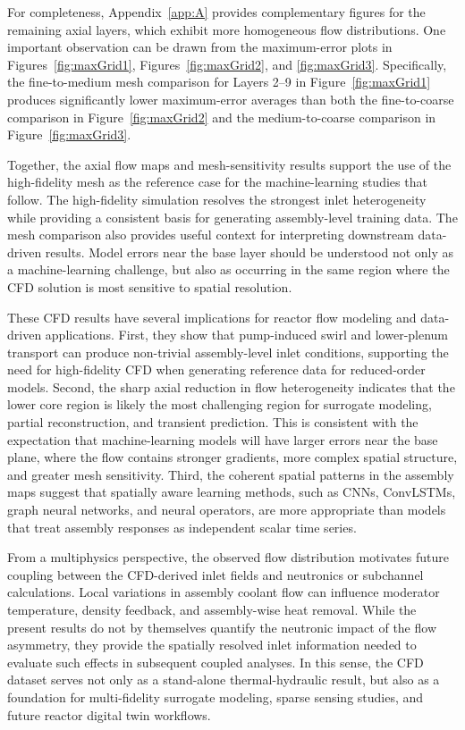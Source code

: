 \documentclass[review]{elsarticle}
\theoremstyle{definition}
\theoremstyle{definition}
\theoremstyle{remark}
\begin{document}
For completeness, Appendix~\ref{app:A} provides complementary figures for the remaining axial layers, which exhibit more homogeneous flow distributions. One important observation can be drawn from the maximum-error plots in Figures~\ref{fig:maxGrid1}, Figures~\ref{fig:maxGrid2}, and \ref{fig:maxGrid3}. Specifically, the fine-to-medium mesh comparison for Layers 2--9 in Figure~\ref{fig:maxGrid1} produces significantly lower maximum-error averages than both the fine-to-coarse comparison in Figure~\ref{fig:maxGrid2} and the medium-to-coarse comparison in Figure~\ref{fig:maxGrid3}.

Together, the axial flow maps and mesh-sensitivity results support the use of the high-fidelity mesh as the reference case for the machine-learning studies that follow. The high-fidelity simulation resolves the strongest inlet heterogeneity while providing a consistent basis for generating assembly-level training data. The mesh comparison also provides useful context for interpreting downstream data-driven results. Model errors near the base layer should be understood not only as a machine-learning challenge, but also as occurring in the same region where the CFD solution is most sensitive to spatial resolution.

These CFD results have several implications for reactor flow modeling and data-driven applications. First, they show that pump-induced swirl and lower-plenum transport can produce non-trivial assembly-level inlet conditions, supporting the need for high-fidelity CFD when generating reference data for reduced-order models. Second, the sharp axial reduction in flow heterogeneity indicates that the lower core region is likely the most challenging region for surrogate modeling, partial reconstruction, and transient prediction. This is consistent with the expectation that machine-learning models will have larger errors near the base plane, where the flow contains stronger gradients, more complex spatial structure, and greater mesh sensitivity. Third, the coherent spatial patterns in the assembly maps suggest that spatially aware learning methods, such as CNNs, ConvLSTMs, graph neural networks, and neural operators, are more appropriate than models that treat assembly responses as independent scalar time series.

From a multiphysics perspective, the observed flow distribution motivates future coupling between the CFD-derived inlet fields and neutronics or subchannel calculations. Local variations in assembly coolant flow can influence moderator temperature, density feedback, and assembly-wise heat removal. While the present results do not by themselves quantify the neutronic impact of the flow asymmetry, they provide the spatially resolved inlet information needed to evaluate such effects in subsequent coupled analyses. In this sense, the CFD dataset serves not only as a stand-alone thermal-hydraulic result, but also as a foundation for multi-fidelity surrogate modeling, sparse sensing studies, and future reactor digital twin workflows.
\end{document}
